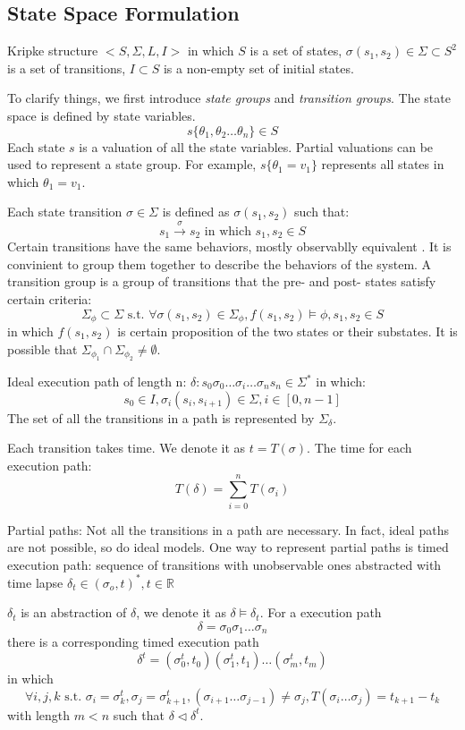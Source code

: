 \subsection{State Space Formulation}
\label{[statespaceformulation]}
Kripke structure $<S,\Sigma,L,I>$ in which $S$ is a set of states, $\sigma(s_1,s_2)\in\Sigma\subset S^2$ is a set of transitions, $I\subset S$ is a non-empty set of initial states.

To clarify things, we first introduce \emph{state groups} and \emph{transition groups}. The state space is defined by state variables. 
$$s\{\theta_1,\theta_2\dots \theta_n\}\in S$$
Each state $s$ is a valuation of all the state variables. Partial valuations can be used to represent a state group. For example, $s\{\theta_1=v_1\}$ represents all states in which $\theta_1=v_1$.

Each state transition $\sigma\in\Sigma$ is defined as $\sigma(s_1,s_2)$ such that:
$$s_1\xrightarrow{\sigma}s_2\text{ in which }s_1,s_2\in S$$
Certain transitions have the same behaviors, mostly observablly equivalent . It is convinient to group them together to describe the behaviors of the system. A \textsf{transition group} is a group of transitions that the pre- and post- states satisfy certain criteria:
$$\Sigma_\phi\subset\Sigma \text{ s.t. }\forall\sigma(s_1,s_2)\in\Sigma_\phi,f(s_1,s_2)\models\phi,s_1,s_2\in S$$
in which $f(s_1,s_2)$ is certain proposition of the two states or their substates. It is possible that $\Sigma_{\phi_1}\cap\Sigma_{\phi_2}\neq \emptyset$.

Ideal execution path of length n: $\delta:s_0\sigma_0\dots\sigma_i\dots\sigma_ns_n\in\Sigma^*$ in which: 
$$s_0\in I, \sigma_i(s_i,s_{i+1})\in\Sigma, i\in[0,n-1]$$ 
The set of all the transitions in a path is represented by $\Sigma_\delta$.

Each transition takes time. We denote it as $t=T(\sigma)$. The time for each execution path: $$T(\delta)=\sum_{i=0}^nT(\sigma_i)$$

Partial paths: Not all the transitions in a path are necessary. In fact, ideal paths are not possible, so do ideal models. One way to represent partial paths is timed execution path: sequence of transitions with unobservable ones abstracted with time lapse $\delta_t\in(\sigma_o,t)^*, t\in \mathbb{R}$

$\delta_t$ is an abstraction of $\delta$, we denote it as $\delta\models\delta_t$. For a execution path 
$$\delta=\sigma_0\sigma_1\dots\sigma_n$$
there is a corresponding timed execution path 
$$\delta^t=(\sigma_0^t,t_0)(\sigma_1^t,t_1)\dots(\sigma_m^t,t_m)$$ 
in which
$$\forall i,j,k \text{ s.t. } \sigma_i=\sigma_k^t,\sigma_j=\sigma_{k+1}^t,(\sigma_{i+1}\dots\sigma_{j-1})\neq\sigma_{j},T(\sigma_i\dots\sigma_j)=t_{k+1}-t_k$$
with length $m<n$ such that $\delta\triangleleft\delta^t$. 

